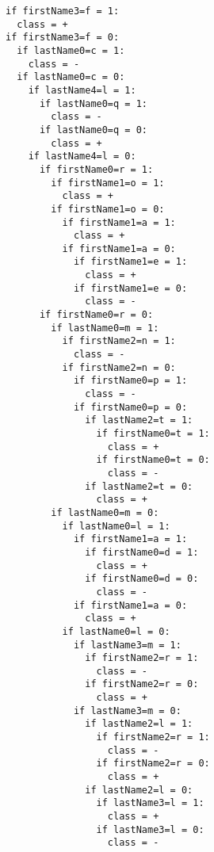 \begin{verbatim}
if firstName3=f = 1: 
  class = +
if firstName3=f = 0:
  if lastName0=c = 1: 
    class = -
  if lastName0=c = 0:
    if lastName4=l = 1:
      if lastName0=q = 1: 
        class = -
      if lastName0=q = 0: 
        class = +
    if lastName4=l = 0:
      if firstName0=r = 1:
        if firstName1=o = 1: 
          class = +
        if firstName1=o = 0:
          if firstName1=a = 1: 
            class = +
          if firstName1=a = 0:
            if firstName1=e = 1: 
              class = +
            if firstName1=e = 0: 
              class = -
      if firstName0=r = 0:
        if lastName0=m = 1:
          if firstName2=n = 1: 
            class = -
          if firstName2=n = 0:
            if firstName0=p = 1: 
              class = -
            if firstName0=p = 0:
              if lastName2=t = 1:
                if firstName0=t = 1: 
                  class = +
                if firstName0=t = 0: 
                  class = -
              if lastName2=t = 0: 
                class = +
        if lastName0=m = 0:
          if lastName0=l = 1:
            if firstName1=a = 1:
              if firstName0=d = 1: 
                class = +
              if firstName0=d = 0: 
                class = -
            if firstName1=a = 0: 
              class = +
          if lastName0=l = 0:
            if lastName3=m = 1:
              if firstName2=r = 1: 
                class = -
              if firstName2=r = 0: 
                class = +
            if lastName3=m = 0:
              if lastName2=l = 1:
                if firstName2=r = 1: 
                  class = -
                if firstName2=r = 0: 
                  class = +
              if lastName2=l = 0:
                if lastName3=l = 1: 
                  class = +
                if lastName3=l = 0: 
                  class = -

\end{verbatim}